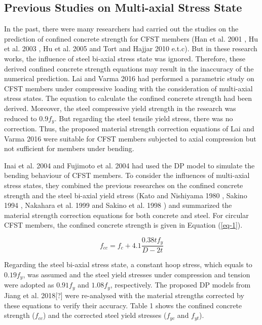 \documentclass[12pt,a4]{article}
\begin{document}
	\subsection{Previous Studies on Multi-axial Stress State}
	In the past, there were many researchers had carried out the studies on the prediction of confined concrete strength for CFST members (Han et al. 2001 \cite{RN23}, Hu et al. 2003 \cite{RN1}, Hu et al. 2005 \cite{RN29} and Tort and Hajjar 2010 \cite{RN46} e.t.c). But in these research works, the influence of steel bi-axial stress state was ignored. Therefore, these derived confined concrete strength equations may result in the inaccuracy of the numerical prediction. Lai and Varma 2016 \cite{RN32} had performed a parametric study on CFST members under compressive loading with the consideration of multi-axial stress states. The equation to calculate the confined concrete strength had been derived. Moreover, the steel compressive yield strength in the research was reduced to $0.9f_y$. But regarding the steel tensile yield stress, there was no correction. Thus, the proposed material strength correction equations of Lai and Varma 2016 \cite{RN32} were suitable for CFST members subjected to axial compression but not sufficient for members under bending.
	\par
	Inai et al. 2004 \cite{RN30} and Fujimoto et al. 2004 \cite{RN15} had used the DP model to simulate the bending behaviour of CFST members. To consider the influences of multi-axial stress states, they combined the previous researches on the confined concrete strength and the steel bi-axial yield stress (Kato and Nishiyama 1980 \cite{RN139}, Sakino 1994 \cite{RN138}, Nakahara et al. 1999 \cite{RN137} and Sakino et al. 1998 \cite{RN135}) and summarized the material strength correction equations for both concrete and steel. For circular CFST members, the confined concrete strength is given in Equation (\ref{eq-1}).
	\par
	\begin{equation}
	f_{cc} = f_c + 4.1 \frac{0.38tf_y}{D-2t}
	\label{eq-1}
	\end{equation}
	\par
	Regarding the steel bi-axial stress state, a constant hoop stress, which equals to $0.19f_y$, was assumed and the steel yield stresses under compression and tension were adopted as $0.91f_y$ and $1.08f_y$, respectively. The proposed DP models from Jiang et al. 2018[?] were re-analysed with the material strengths corrected by these equations to verify their accuracy. Table 1 shows the confined concrete strength ($f_{cc}$) and the corrected steel yield stresses ($f_{yc}$ and $f_{yt}$).
\end{document}

